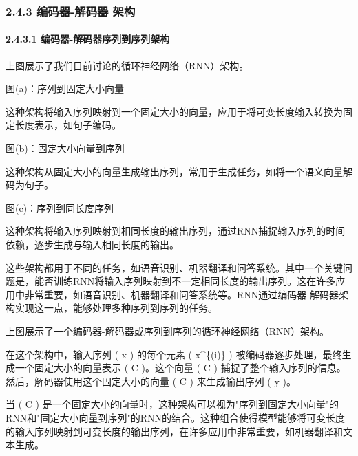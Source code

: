 \subsubsection{\texorpdfstring{\textbf{2.4.3 编码器-解码器
架构}}{2.4.3 编码器-解码器 架构}}\label{243-ux7f16ux7801ux5668-ux89e3ux7801ux5668-ux67b6ux6784}

\paragraph{\texorpdfstring{\textbf{2.4.3.1}
\textbf{编码器-解码器序列到序列架构}}{2.4.3.1 编码器-解码器序列到序列架构}}\label{2431-ux7f16ux7801ux5668-ux89e3ux7801ux5668ux5e8fux5217ux5230ux5e8fux5217ux67b6ux6784}


上图展示了我们目前讨论的循环神经网络（RNN）架构。

图(a)：序列到固定大小向量

这种架构将输入序列映射到一个固定大小的向量，应用于将可变长度输入转换为固定长度表示，如句子编码。

图(b)：固定大小向量到序列

这种架构从固定大小的向量生成输出序列，常用于生成任务，如将一个语义向量解码为句子。

图(c)：序列到同长度序列

这种架构将输入序列映射到相同长度的输出序列，通过RNN捕捉输入序列的时间依赖，逐步生成与输入相同长度的输出。

这些架构都用于不同的任务，如语音识别、机器翻译和问答系统。其中一个关键问题是，能否训练RNN将输入序列映射到不一定相同长度的输出序列。这在许多应用中非常重要，如语音识别、机器翻译和问答系统等。RNN通过编码器-解码器架构实现这一点，能够处理多种序列到序列的任务。


上图展示了一个编码器-解码器或序列到序列的循环神经网络（RNN）架构。

在这个架构中，输入序列 ( x ) 的每个元素 ( x\^{}\{(i)\} )
被编码器逐步处理，最终生成一个固定大小的向量表示 ( C )。这个向量 ( C )
捕捉了整个输入序列的信息。然后，解码器使用这个固定大小的向量 ( C )
来生成输出序列 ( y )。

当 ( C )
是一个固定大小的向量时，这种架构可以视为"序列到固定大小向量"的RNN和"固定大小向量到序列"的RNN的结合。这种组合使得模型能够将可变长度的输入序列映射到可变长度的输出序列，在许多应用中非常重要，如机器翻译和文本生成。

